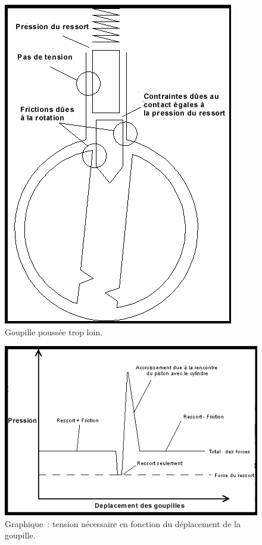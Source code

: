 \documentclass[a4paper,french,11pt,twoside]{report}
\begin{document}
\begin{figure}[h]
  \begin{center}
    \includegraphics[scale=0.6]{images/Image12}
    \caption{Goupille poussée trop loin.\label{goupille_trop_loin}}
  \end{center}
\end{figure}

\begin{figure}[h]
  \begin{center}
    \includegraphics[scale=0.6]{images/Image13}
    \caption{Graphique~: tension nécessaire en fonction du déplacement de la goupille.\label{graphique_tension_deplacement}}
  \end{center}
\end{figure}
\end{document}
